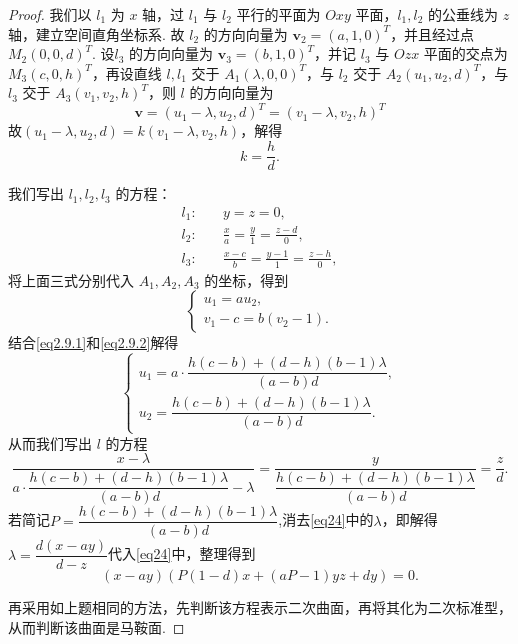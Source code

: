 \documentclass[12pt, a4paper,newtx]{ctexart}
\begin{document}
\begin{proof}
	我们以 $l_1$ 为 $x$ 轴，过 $l_1$ 与 $l_2$ 平行的平面为 $Oxy$ 平面，$l_1, l_2$ 的公垂线为 $z$ 轴，建立空间直角坐标系. 故 $l_2$ 的方向向量为 $\bm{v}_2 = (a, 1, 0)^T$，并且经过点 $M_2(0, 0, d)^T$. 设$l_3$ 的方向向量为 $\bm{v}_3 = (b, 1, 0)^T$，并记 $l_3$ 与 $Ozx$ 平面的交点为 $M_3(c, 0, h)^T$，再设直线 $l, l_1$ 交于 $A_1(\lambda, 0, 0)^T$，与 $l_2$ 交于 $A_2(u_1, u_2, d)^T$，与 $l_3$ 交于 $A_3(v_1, v_2, h)^T$，则 $l$ 的方向向量为
	\begin{equation}\label{eq2.9.1}
		\bm{v} = (u_1 - \lambda, u_2, d)^T = (v_1 - \lambda, v_2, h)^T
	\end{equation}
	故$ (u_1 - \lambda, u_2, d) = k(v_1 - \lambda, v_2, h)$，解得\begin{equation}\label{eq2.9.2}
		k = \dfrac{h}{d}.
	\end{equation}
	
	我们写出 $l_1, l_2, l_3$ 的方程：
	\begin{align}
		l_1 : &\quad y = z = 0,\\l_2 : &\quad\frac{x}{a} = \frac{y}{1} = \frac{z - d}{0},\\l_3 : &\quad\frac{x - c}{b} = \frac{y - 1}{1} = \frac{z - h}{0},
	\end{align} 
	将上面三式分别代入 $A_1, A_2, A_3$ 的坐标，得到\begin{equation}\label{eq2.9.6}
		\begin{cases}
			u_1 = a u_2, \\
			v_1 - c = b (v_2 - 1).
		\end{cases} 
	\end{equation}
	结合\eqref{eq2.9.1}和\eqref{eq2.9.2}解得
	\begin{equation}\label{eq24}
		\begin{cases}
			u_1 = a \cdot \dfrac{h(c - b) + (d - h)(b - 1)\lambda}{(a - b)d}, \\
			u_2 = \dfrac{h(c - b) + (d - h)(b - 1)\lambda}{(a - b)d}.
		\end{cases}
	\end{equation}
	从而我们写出 $l$ 的方程
	\[
	\frac{x - \lambda}{a\cdot\dfrac{h(c - b) + (d - h)(b - 1)\lambda}{(a-b)d}-\lambda} = \frac{y}{\dfrac{h(c - b) + (d - h)(b - 1)\lambda}{(a-b)d}} = \frac{z}{d}.
	\]
	若简记$P=\dfrac{h(c - b) + (d - h)(b - 1)\lambda}{(a-b)d}$,消去\eqref{eq24}中的$\lambda$，即解得$\lambda=\dfrac{d(x-ay)}{d-z}$代入\eqref{eq24}中，整理得到\[(x-ay)\left(P(1-d)x+(aP-1)yz+dy\right)=0.\]
	
	再采用如上题相同的方法，先判断该方程表示二次曲面，再将其化为二次标准型，从而判断该曲面是马鞍面. 
\end{proof}
\end{document}
